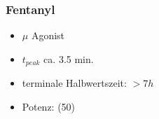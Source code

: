 \mode*

\begin{frame}
\frametitle{Fentanyl}
\begin{itemize}[<+->]
\item
$\mu$ Agonist
\item
$t_{peak}$ ca. 3.5 min.
\item
terminale Halbwertszeit: $ > 7 h$
\item 
Potenz: (50)
\end{itemize}
\infina
\end{frame}

